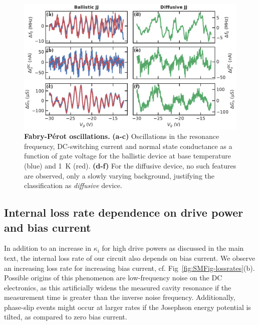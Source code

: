 \begin{figure}[!h]
	\centering
	\includegraphics[width=\linewidth]{chapter-gJJ-CPR/figs/SMFigure-ballistic}
	\caption{
		\textbf{Fabry-Pérot oscillations.}
		\textbf{(a-c)} Oscillations in the resonance frequency, DC-switching current and normal state conductance as a function of gate voltage for the ballistic device at base temperature (blue) and \SI{1}{\kelvin} (red).
		\textbf{(d-f)} For the diffusive device, no such features are observed, only a slowly varying background, justifying the classification as \textit{diffusive} device.
	}
	\label{fig:SMFig-ballistic}
\end{figure}

\subsection{Internal loss rate dependence on drive power and bias current}\label{sec:kintib}

In addition to an increase in $\kappa_i$ for high drive powers as discussed in the main text, the internal loss rate of our circuit also depends on bias current.
%
We observe an increasing loss rate for increasing bias current, cf. Fig~\ref{fig:SMFig-lossrates}(b).
%
Possible origins of this phenomenon are low-frequency noise on the DC electronics, as this artificially widens the measured cavity resonance if the measurement time is greater than the inverse noise frequency.
%
Additionally, phase-slip events might occur at larger rates if the Josephson energy potential is tilted, as compared to zero bias current.

